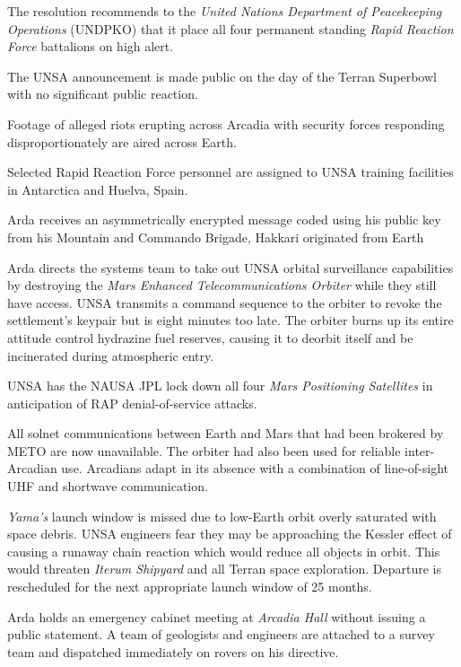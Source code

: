 The resolution recommends to the {\it United Nations Department of Peacekeeping Operations} (UNDPKO) that it place all four permanent standing {\it Rapid Reaction Force} battalions on high alert.

The UNSA announcement is made public on the day of the Terran Superbowl with no significant public reaction.
\StopTimelineDate

Footage of alleged riots erupting across Arcadia with security forces responding disproportionately are aired across Earth.
\StopTimelineDate

Selected Rapid Reaction Force personnel are assigned to UNSA training facilities in Antarctica and Huelva, Spain.
\StopTimelineDate

Arda receives an asymmetrically encrypted message coded using his public key from his Mountain and Commando Brigade, Hakkari originated from Earth
\StopTimelineDate

Arda directs the systems team to take out UNSA orbital surveillance capabilities by destroying the {\it Mars Enhanced Telecommunications Orbiter} while they still have access. UNSA transmits a command sequence to the orbiter to revoke the settlement's keypair but is eight minutes too late. The orbiter burns up its entire attitude control hydrazine fuel reserves, causing it to deorbit itself and be incinerated during atmospheric entry. 

UNSA has the NAUSA JPL lock down all four {\it Mars Positioning Satellites} in anticipation of RAP denial-of-service attacks.

All solnet communications between Earth and Mars that had been brokered by METO are now unavailable. The orbiter had also been used for reliable inter-Arcadian use. Arcadians adapt in its absence with a combination of line-of-sight UHF and shortwave communication.
\StopTimelineDate

{\it Yama's} launch window is missed due to low-Earth orbit overly saturated with space debris. UNSA engineers fear they may be approaching the Kessler effect of causing a runaway chain reaction which would reduce all objects in orbit. This would threaten {\it Iterum Shipyard} and all Terran space exploration. Departure is rescheduled for the next appropriate launch window of 25 months.
\StopTimelineDate

Arda holds an emergency cabinet meeting at {\it Arcadia Hall} without issuing a public statement. A team of geologists and engineers are attached to a survey team and dispatched immediately on rovers on his directive.
\StopTimelineDate

